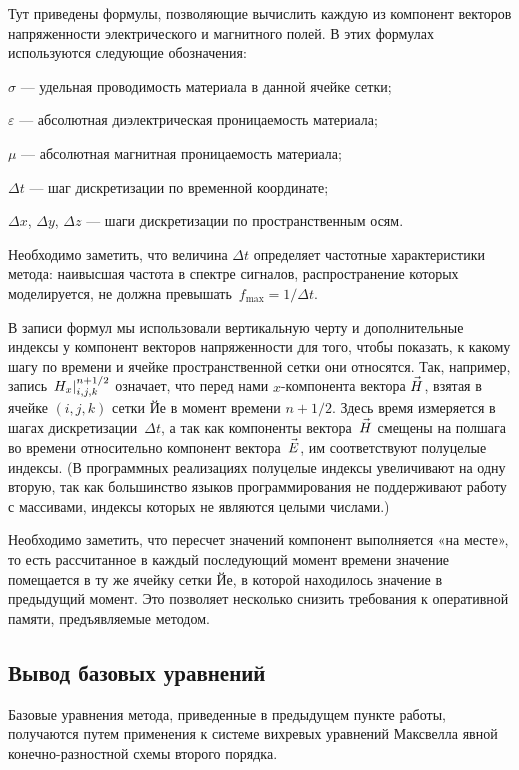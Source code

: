 \noindent
Тут приведены формулы, позволяющие вычислить каждую из компонент векторов
напряженности электрического и магнитного полей. В этих формулах используются
следующие обозначения:
\begin{where}
\item $\sigma$ --- удельная проводимость материала в данной ячейке сетки;
\item $\varepsilon$ --- абсолютная диэлектрическая проницаемость материала;
\item $\mu$ --- абсолютная магнитная проницаемость материала;
\item $\Delta t$ --- шаг дискретизации по временной координате;
\item $\Delta x$, $\Delta y$, $\Delta z$ --- шаги дискретизации
      по пространственным осям.
\end{where}

\noindent
Необходимо заметить, что величина $\Delta t$ определяет частотные характеристики
метода: наивысшая частота в спектре сигналов, распространение которых
моделируется, не должна превышать~$f_{\text{max}} = 1/\Delta{t}$.

В записи формул мы использовали вертикальную черту и дополнительные индексы у компонент векторов
напряженности для того, чтобы показать, к какому шагу по времени и ячейке пространственной сетки они относятся.
Так, например, запись $\left.H_x\right|^{n+1/2}_{i,j,k}$ означает, что перед нами
$x$-компонента вектора $\vec{H\mathstrut}$, взятая в ячейке $(i, j, k)$ сетки Йе
в момент времени $n+1/2$. Здесь время измеряется в шагах
дискретизации~$\Delta{t}$, а так как компоненты вектора~$\vec{H\mathstrut}$ смещены на
полшага во времени относительно компонент вектора~$\vec{E\mathstrut}$, им соответствуют
полуцелые индексы. (В программных реализациях полуцелые индексы увеличивают на
одну вторую, так как большинство языков программирования не поддерживают
работу с массивами, индексы которых не являются целыми числами.)

Необходимо заметить, что пересчет значений компонент выполняется «на месте», то
есть рассчитанное в каждый последующий момент времени значение помещается в ту
же ячейку сетки Йе, в которой находилось значение в предыдущий момент. Это
позволяет несколько снизить требования к оперативной памяти, предъявляемые методом.


\subsection{Вывод базовых уравнений}

Базовые уравнения метода, приведенные в предыдущем пункте работы, получаются
путем применения к системе вихревых уравнений Максвелла явной конечно-разностной
схемы второго порядка.

